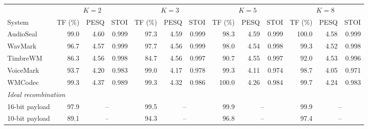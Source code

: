 \begin{tabular}{l*{12}{r}}
\toprule
& \multicolumn{3}{c}{$K=2$}
& \multicolumn{3}{c}{$K=3$}
& \multicolumn{3}{c}{$K=5$}
& \multicolumn{3}{c}{$K=8$} \\
\cmidrule(lr){2-4}\cmidrule(lr){5-7}\cmidrule(lr){8-10}\cmidrule(lr){11-13}
System
& TF (\%) & PESQ & STOI
& TF (\%) & PESQ & STOI
& TF (\%) & PESQ & STOI
& TF (\%) & PESQ & STOI \\
\midrule
AudioSeal
& 99.0 & 4.60 & 0.999
& 97.3 & 4.59 & 0.999
& 98.3 & 4.59 & 0.999
& 100.0 & 4.58 & 0.999 \\
WavMark
& 96.7 & 4.57 & 0.999
& 97.7 & 4.56 & 0.999
& 98.0 & 4.54 & 0.998
& 99.3 & 4.52 & 0.998 \\
TimbreWM
& 86.3 & 4.56 & 0.998
& 84.7 & 4.56 & 0.997
& 90.7 & 4.55 & 0.997
& 92.0 & 4.53 & 0.996 \\
VoiceMark
& 93.7 & 4.20 & 0.983
& 99.0 & 4.17 & 0.978
& 99.3 & 4.11 & 0.974
& 98.7 & 4.05 & 0.971 \\
WMCodec
& 99.3 & 4.37 & 0.989
& 99.3 & 4.32 & 0.986
& 100.0 & 4.26 & 0.984
& 99.7 & 4.24 & 0.983 \\
\midrule
\multicolumn{13}{l}{\textit{Ideal recombination}} \\
16-bit payload
& 97.9 & \multicolumn{2}{c}{--}
& 99.5 & \multicolumn{2}{c}{--}
& 99.9 & \multicolumn{2}{c}{--}
& 99.9 & \multicolumn{2}{c}{--} \\
10-bit payload
& 89.1 & \multicolumn{2}{c}{--}
& 94.3 & \multicolumn{2}{c}{--}
& 96.8 & \multicolumn{2}{c}{--}
& 97.4 & \multicolumn{2}{c}{--} \\
\bottomrule
\end{tabular}
